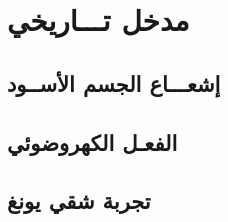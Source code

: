 \chapter{مدخل تـــاريخي} %

\label{Chapter1} 

\section{إشعـــاع الجسم اﻷســود}

\section{الفعـل الكهروضوئي}

\section{تجربة شقي يونغ}



